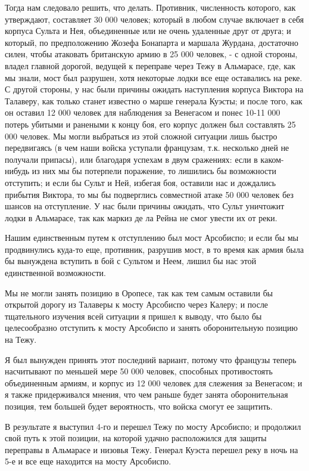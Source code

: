 \documentclass[
  oneside,
  12pt,
  titlepage]{book}
\begin{document}
Тогда нам следовало решить, что делать. Противник, численность которого, как утверждают, составляет 30 000 человек; который в любом случае включает в себя корпуса Сульта и Нея, объединенные или не очень удаленные друг от друга; и который, по предположению Жозефа Бонапарта и маршала Журдана, достаточно силен, чтобы атаковать британскую армию в 25 000 человек, - с одной стороны, владел главной дорогой, ведущей к переправе через Тежу в Альмарасе, где, как мы знали, мост был разрушен, хотя некоторые лодки все еще оставались на реке. С другой стороны, у нас были причины ожидать наступления корпуса Виктора на Талаверу, как только станет известно о марше генерала Куэсты; и после того, как он оставил 12 000 человек для наблюдения за Венегасом и понес 10-11 000 потерь убитыми и ранеными к концу боя, его корпус должен был составлять 25 000 человек. Мы могли выбраться из этой сложной ситуации лишь быстро передвигаясь (в чем наши войска уступали французам, т.к. несколько дней не получали припасы), или благодаря успехам в двум сражениях: если в каком-нибудь из них мы бы потерпели поражение, то лишились бы возможности отступить; и если бы Сульт и Ней, избегая боя, оставили нас и дождались прибытия Виктора, то мы бы подверглись совместной атаке 50 000 человек без шансов на отступление. У нас были причины ожидать, что Сульт уничтожит лодки в Альмарасе, так как маркиз де ла Рейна не смог увести их от реки.

Нашим единственным путем к отступлению был мост Арсобиспо; и если бы мы продвинулись куда-то еще, противник, разрушив мост, в то время как армия была бы вынуждена вступить в бой с Сультом и Неем, лишил бы нас этой единственной возможности.

Мы не могли занять позицию в Оропесе, так как тем самым оставили бы открытой дорогу из Талаверы к мосту Арсобиспо через Калеру; и после тщательного изучения всей ситуации я пришел к выводу, что было бы целесообразно отступить к мосту Арсобиспо и занять оборонительную позицию на Тежу.

Я был вынужден принять этот последний вариант, потому что французы теперь насчитывают по меньшей мере 50 000 человек, способных противостоять объединенным армиям, и корпус из 12 000 человек для слежения за Венегасом; и я также придерживался мнения, что чем раньше будет занята оборонительная позиция, тем большей будет вероятность, что войска смогут ее защитить.

В результате я выступил 4-го и перешел Тежу по мосту Арсобиспо; и продолжил свой путь к этой позиции, на которой удачно расположился для защиты переправы в Альмарасе и низовья Тежу. Генерал Куэста перешел реку в ночь на 5-е и все еще находится на мосту Арсобиспо.
\end{document}
